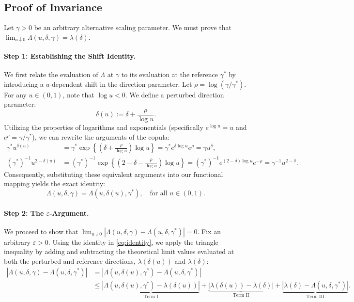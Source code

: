 \documentclass{article}
\begin{document}
\subsection*{Proof of Invariance}

Let $\gamma > 0$ be an arbitrary alternative scaling parameter. We must prove that $\lim_{u\downarrow 0} \Lambda(u, \delta, \gamma) = \lambda(\delta)$.

\paragraph{Step 1: Establishing the Shift Identity.}
We first relate the evaluation of $\Lambda$ at $\gamma$ to its evaluation at the reference $\gamma^*$ by introducing a $u$-dependent shift in the direction parameter. Let $\rho = \log(\gamma / \gamma^*)$. For any $u \in (0,1)$, note that $\log u < 0$. We define a perturbed direction parameter:
\[
\delta(u) := \delta + \frac{\rho}{\log u}.
\]
Utilizing the properties of logarithms and exponentials (specifically $e^{\log u} = u$ and $e^\rho = \gamma / \gamma^*$), we can rewrite the arguments of the copula:
\begin{align*}
    \gamma^* u^{\delta(u)} &= \gamma^* \exp\left\{ \left(\delta + \frac{\rho}{\log u}\right) \log u \right\} = \gamma^* e^{\delta \log u} e^\rho = \gamma u^\delta, \\
    (\gamma^*)^{-1} u^{2-\delta(u)} &= (\gamma^*)^{-1} \exp\left\{ \left(2 - \delta - \frac{\rho}{\log u}\right) \log u \right\} = (\gamma^*)^{-1} e^{(2-\delta)\log u} e^{-\rho} = \gamma^{-1} u^{2-\delta}.
\end{align*}
Consequently, substituting these equivalent arguments into our functional mapping yields the exact identity:
\begin{equation} \label{eq:identity}
    \Lambda(u, \delta, \gamma) = \Lambda(u, \delta(u), \gamma^*), \quad \text{for all } u \in (0,1).
\end{equation}

\paragraph{Step 2: The $\varepsilon$-Argument.}
We proceed to show that $\lim_{u\downarrow 0} |\Lambda(u, \delta, \gamma) - \Lambda(u, \delta, \gamma^*)| = 0$. Fix an arbitrary $\varepsilon > 0$. Using the identity in \eqref{eq:identity}, we apply the triangle inequality by adding and subtracting the theoretical limit values evaluated at both the perturbed and reference directions, $\lambda(\delta(u))$ and $\lambda(\delta)$:
\begin{align} 
    |\Lambda(u, \delta, \gamma) - \Lambda(u, \delta, \gamma^*)| 
    &= |\Lambda(u, \delta(u), \gamma^*) - \Lambda(u, \delta, \gamma^*)| \nonumber \\
    &\le \underbrace{|\Lambda(u, \delta(u), \gamma^*) - \lambda(\delta(u))|}_{\text{Term I}} + \underbrace{|\lambda(\delta(u)) - \lambda(\delta)|}_{\text{Term II}} + \underbrace{|\lambda(\delta) - \Lambda(u, \delta, \gamma^*)|}_{\text{Term III}}. \label{eq:triangle}
\end{align}
\end{document}
